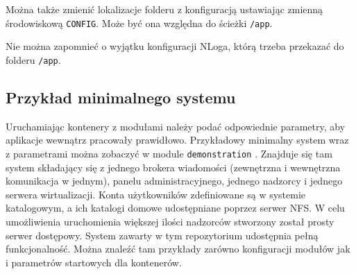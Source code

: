 \documentclass[../opis-rozwiazania.tex]{subfiles}
\begin{document}
Można także zmienić lokalizacje folderu z konfiguracją ustawiając zmienną środowiskową \texttt{CONFIG}.
Może być ona względna do ścieżki \texttt{/app}.

Nie można zapomnieć o wyjątku konfiguracji NLoga, którą trzeba przekazać do folderu \texttt{/app}.

\subsection{Przykład minimalnego systemu}
Uruchamiając kontenery z modułami należy podać odpowiednie parametry, aby aplikacje wewnątrz pracowały prawidłowo.
Przykładowy minimalny system wraz z parametrami można zobaczyć w module \texttt{demonstration} \parencite{ocd-demo}.
Znajduje się tam system składający się z jednego brokera wiadomości (zewnętrzna i wewnętrzna komunikacja w jednym), panelu administracyjnego, jednego nadzorcy i jednego serwera wirtualizacji. Konta użytkowników zdefiniowane są w systemie katalogowym, a ich katalogi domowe udostępniane poprzez serwer NFS. W celu umożliwienia uruchomienia większej ilości nadzorców stworzony został prosty serwer dostępowy.
System zawarty w tym repozytorium udostępnia pełną funkcjonalność.
Można znaleźć tam przykłady zarówno konfiguracji modułów jak i parametrów startowych dla kontenerów.
\end{document}
